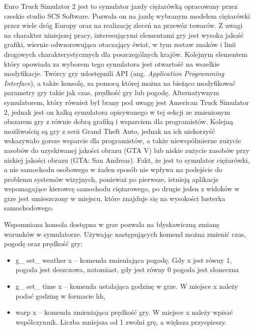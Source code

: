 Euro Truck Simulator 2 jest to symulator jazdy ciężarówką opracowany przez czeskie studio SCS Software.
Pozwala on na jazdę wybranym modelem ciężarówki przez wiele dróg Europy oraz na realizację zleceń na przewóz towarów. 
Z uwagi na charakter niniejszej pracy, interesującymi elementami gry jest wysoka jakość grafiki, wiernie odwzorowująca otaczający świat, w tym zestaw znaków i linii drogowych charakterystycznych dla poszczególnych krajów. 
Kolejnym elementem który opowiada za wyborem tego symulatora jest otwartość na wszelkie modyfikacje. 
Twórcy gry udostępnili API (ang. \textit{Application Programming Interface}), a także konsolę, za pomocą której można na bieżąco modyfikować parametry gry takie jak czas, prędkość gry lub pogodę.
Alternatywnym symulatorem, który również był brany pod uwagę jest American Truck Simulator 2, jednak jest on kalką symulatora opisywanego w tej sekcji ze zmienionym obszarem gry z równie dobrą grafiką i wsparciem dla programistów. %
Kolejną możliwością są gry z serii Grand Theft Auto, jednak na ich niekorzyść wskazywało gorsze wsparcie dla programistów, a także niewspółmierne zużycie zasobów do uzyskiwanej jakości obrazu (GTA V) lub niskie zużycie zasobów przy niskiej jakości obrazu (GTA: San Andreas). 
Fakt, że jest to symulator ciężarówki, a nie samochodu osobowego w żaden sposób nie wpływa na podejście do problemu systemów wizyjnych, ponieważ po pierwsze, istnieją aplikacje wspomagające kierowcę samochodu ciężarowego, po drugie jeden z widoków w grze jest umieszczony w miejscu, które znajduje się na wysokości lusterka samochodowego.

Wspomniana konsola dostępna w grze pozwala na błyskawiczną zmianę warunków w symulatorze. 
Używając następujących komend można zmienić czas, pogodę oraz prędkość gry:

\begin{itemize}
\item g\_ set\_ weather x -- komenda zmieniająca pogodę. Gdy x jest równy 1, pogoda jest deszczowa, natomiast, gdy jest równy 0 pogoda jest słoneczna
\item g\_ set\_ time x -- komenda ustalająca godzinę w grze. W miejsce x należy podać godzinę w formacie hh,
\item warp x -- komenda zmieniająca prędkość gry. W miejsce x należy wpisać współczynnik. Liczba mniejsza od 1 zwolni grę, a większa przyspieszy.
\end{itemize}


